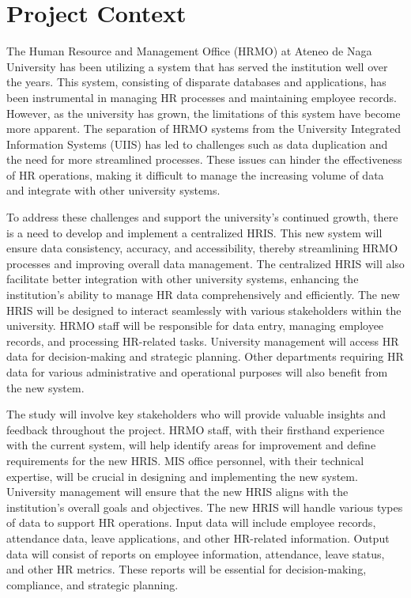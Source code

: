 \section{Project Context}
    
    The Human Resource and Management Office (HRMO) at Ateneo de Naga University has been utilizing a system that has served the institution well over the years. This system, consisting of disparate databases and applications, has been instrumental in managing HR processes and maintaining employee records. However, as the university has grown, the limitations of this system have become more apparent. The separation of HRMO systems from the University Integrated Information Systems (UIIS) has led to challenges such as data duplication and the need for more streamlined processes. These issues can hinder the effectiveness of HR operations, making it difficult to manage the increasing volume of data and integrate with other university systems.
    
    To address these challenges and support the university's continued growth, there is a need to develop and implement a centralized HRIS. This new system will ensure data consistency, accuracy, and accessibility, thereby streamlining HRMO processes and improving overall data management. The centralized HRIS will also facilitate better integration with other university systems, enhancing the institution's ability to manage HR data comprehensively and efficiently. The new HRIS will be designed to interact seamlessly with various stakeholders within the university. HRMO staff will be responsible for data entry, managing employee records, and processing HR-related tasks. University management will access HR data for decision-making and strategic planning. Other departments requiring HR data for various administrative and operational purposes will also benefit from the new system.

    The study will involve key stakeholders who will provide valuable insights and feedback throughout the project. HRMO staff, with their firsthand experience with the current system, will help identify areas for improvement and define requirements for the new HRIS. MIS office personnel, with their technical expertise, will be crucial in designing and implementing the new system. University management will ensure that the new HRIS aligns with the institution's overall goals and objectives. The new HRIS will handle various types of data to support HR operations. Input data will include employee records, attendance data, leave applications, and other HR-related information. Output data will consist of reports on employee information, attendance, leave status, and other HR metrics. These reports will be essential for decision-making, compliance, and strategic planning.
    
